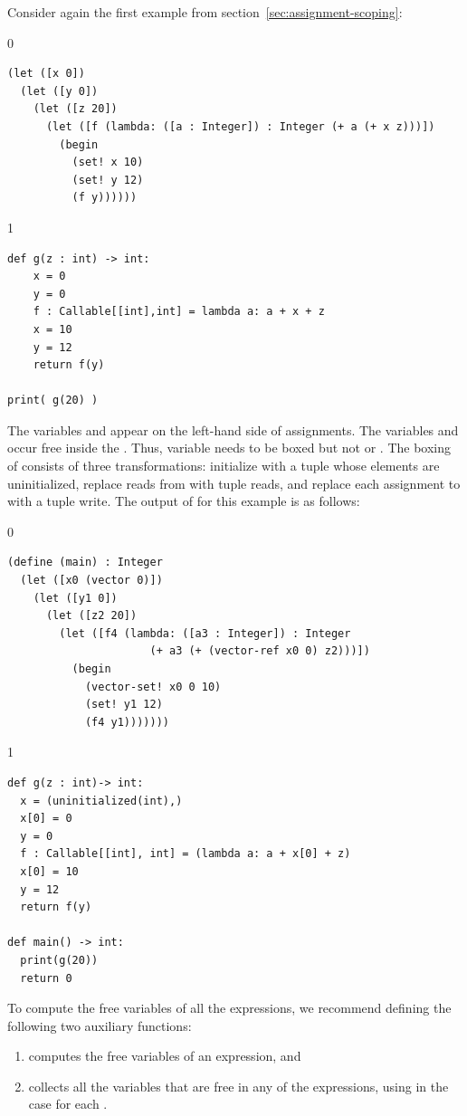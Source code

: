 \documentclass[7x10]{TimesAPriori_MIT}%
\def\racketEd{0}
\def\pythonEd{1}
\def\edition{1}
\newcommand{\pythonColor}[0]{}
\numberwithin{theorem}{chapter}
\numberwithin{definition}{chapter}
\numberwithin{equation}{chapter}
\begin{document}
Consider again the first example from
section~\ref{sec:assignment-scoping}:
%
{\if\edition\racketEd
\begin{lstlisting}
(let ([x 0])
  (let ([y 0])
    (let ([z 20])
      (let ([f (lambda: ([a : Integer]) : Integer (+ a (+ x z)))])
        (begin
          (set! x 10)
          (set! y 12)
          (f y))))))
\end{lstlisting}
\fi}
{\if\edition\pythonEd\pythonColor
\begin{lstlisting}
def g(z : int) -> int:
    x = 0
    y = 0  
    f : Callable[[int],int] = lambda a: a + x + z
    x = 10
    y = 12
    return f(y)

print( g(20) )
\end{lstlisting}
\fi}
%
\noindent The variables  and  appear on the left-hand
side of assignments.  The variables  and  occur free
inside the . Thus, variable  needs to be boxed
but not  or .  The boxing of  consists of
three transformations: initialize  with a tuple whose elements
are uninitialized, replace reads from  with tuple reads, and
replace each assignment to  with a tuple write. The output of
 for this example is as follows:
%
{\if\edition\racketEd
\begin{lstlisting}
(define (main) : Integer
  (let ([x0 (vector 0)])
    (let ([y1 0])
      (let ([z2 20])
        (let ([f4 (lambda: ([a3 : Integer]) : Integer
                      (+ a3 (+ (vector-ref x0 0) z2)))])
          (begin 
            (vector-set! x0 0 10)
            (set! y1 12)
            (f4 y1)))))))
\end{lstlisting}
\fi}
%
{\if\edition\pythonEd\pythonColor
\begin{lstlisting}
def g(z : int)-> int:
  x = (uninitialized(int),)
  x[0] = 0
  y = 0
  f : Callable[[int], int] = (lambda a: a + x[0] + z)
  x[0] = 10
  y = 12
  return f(y)

def main() -> int:
  print(g(20))
  return 0
\end{lstlisting}
\fi}

To compute the free variables of all the  expressions, we
recommend defining the following two auxiliary functions:
\begin{enumerate}
\item {} computes the free variables of an expression, and
\item {} collects all the variables that are
  free in any of the  expressions, using
   in the case for each .
\end{enumerate}
\end{document}
